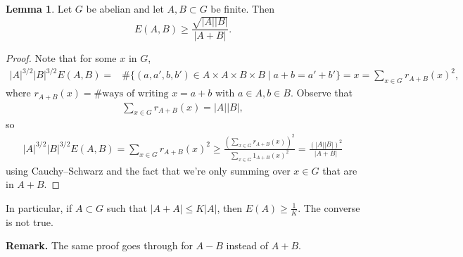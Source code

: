 \documentclass{article}
\theoremstyle{definition}
\newtheorem{lemma}[theorem]{Lemma}
\begin{document}
\begin{lemma}
    Let $G$ be abelian and let $A,B \subset G$ be finite. Then \[
    E(A,B) \ge \frac{\sqrt{\left|A\right|\left|B\right|}}{\left|A+B\right|}.
    \]
\end{lemma}
\begin{proof}
    Note that for some $x$ in $G$, 
    \begin{align*}
        \left|A\right|^{3/2}\left|B\right|^{3/2} E(A,B) =& \#\{(a,a',b,b') \in A \times A \times B \times B \mid a+b=a'+b'\} = x = \sum_{x \in G}^{} r_{A+B}(x)^2,
    \end{align*}
    where $r_{A+B}(x) = \# \text{ways of writing }x=a+b \text{ with }a \in A, b \in B$. Observe that 
    \begin{align*}
        \sum_{x \in G}^{} r_{A+B}(x) = \left|A\right|\left|B\right|,
    \end{align*}
    so \begin{align*}
        \left|A\right|^{3/2}\left|B\right|^{3/2}E(A,B) = \sum_{x \in G}^{} r_{A+B}(x)^2 \ge \frac{\left(\sum_{x \in G}^{} r_{A+B}(x)\right)^2}{\sum_{x \in G}^{} 1_{A+B}(x)^2} = \frac{(\left|A\right|\left|B\right|)^2}{\left|A+B\right|}
    \end{align*}
    using Cauchy--Schwarz and the fact that we're only summing over $x \in G$ that are in $A+B$.
\end{proof}
In particular, if $A \subset G$ such that $\left|A+A\right|\le K\left|A\right|$, then $E(A) \ge \frac{1}{K}$. The converse is not true.
\vspace{1mm}
 
\textbf{Remark.} The same proof goes through for $A-B$ instead of $A+B$.
\end{document}
